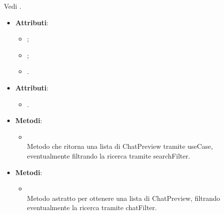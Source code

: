 \documentclass[10pt, a4paper]{article}
\begin{document}
Vedi .


\label{ChatPreviewDettaglio}
\begin{itemize}
    \item \textbf{Attributi}:
    \begin{itemize}
        \item {};
        \item {};
        \item {}.
    \end{itemize}
\end{itemize}



\label{GetChatsControllerDettaglio}
\begin{itemize}
    \item \textbf{Attributi}:
    \begin{itemize}
        \item {}.
    \end{itemize}
    \item \textbf{Metodi}:
    \begin{itemize}
        \item {}\\
        Metodo che ritorna una lista di ChatPreview tramite useCase, eventualmente filtrando la ricerca tramite searchFilter. 
    \end{itemize}
\end{itemize}

\label{GetChatsPortDettaglio}
\begin{itemize}
    \item \textbf{Metodi}:
    \begin{itemize}
        \item {}\\
        Metodo astratto per ottenere una lista di ChatPreview, filtrando eventualmente la ricerca tramite chatFilter.
    \end{itemize}
\end{itemize}
\end{document}
